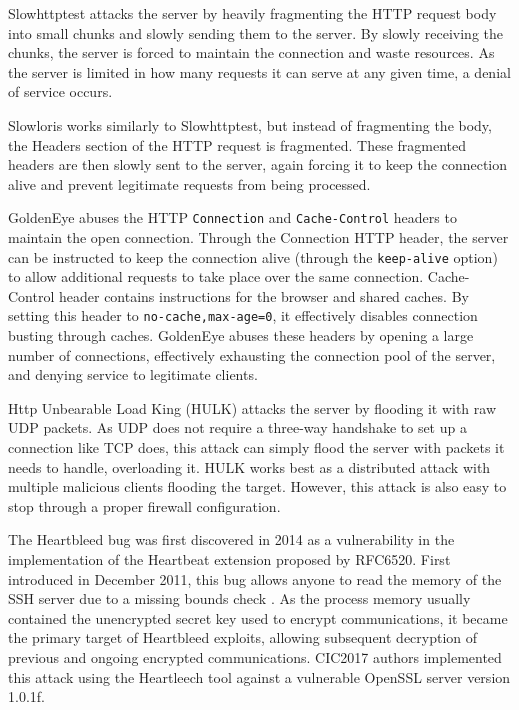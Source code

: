 Slowhttptest attacks the server by heavily fragmenting the HTTP request body into small chunks and slowly sending them to the server. By slowly receiving the chunks, the server is forced to maintain the connection and waste resources. As the server is limited in how many requests it can serve at any given time, a denial of service occurs.

Slowloris works similarly to Slowhttptest, but instead of fragmenting the body, the Headers section of the HTTP request is fragmented. These fragmented headers are then slowly sent to the server, again forcing it to keep the connection alive and prevent legitimate requests from being processed.

GoldenEye abuses the HTTP \texttt{Connection} and \texttt{Cache-Control} headers to maintain the open connection. Through the Connection HTTP header, the server can be instructed to keep the connection alive (through the \texttt{keep-alive} option) to allow additional requests to take place over the same connection. Cache-Control header contains instructions for the browser and shared caches. By setting this header to \texttt{no-cache,max-age=0}, it effectively disables connection busting through caches.
GoldenEye abuses these headers by opening a large number of connections, effectively exhausting the connection pool of the server, and denying service to legitimate clients.

Http Unbearable Load King (HULK) attacks the server by flooding it with raw UDP packets. As UDP does not require a three-way handshake to set up a connection like TCP does, this attack can simply flood the server with packets it needs to handle, overloading it. HULK works best as a distributed attack with multiple malicious clients flooding the target. However, this attack is also easy to stop through a proper firewall configuration. 

The Heartbleed bug \cite{heartbleed} was first discovered in 2014 as a vulnerability in the implementation of the Heartbeat extension proposed by RFC6520. First introduced in December 2011, this bug allows anyone to read the memory of the SSH server due to a missing bounds check \cite{heartbleed_notice}. As the process memory usually contained the unencrypted secret key used to encrypt communications, it became the primary target of Heartbleed exploits, allowing subsequent decryption of previous and ongoing encrypted communications. CIC2017 authors implemented this attack using the Heartleech tool \cite{heartleech} against a vulnerable OpenSSL server version 1.0.1f. 

